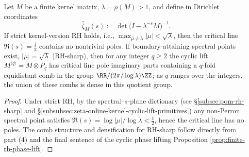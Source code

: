 \begin{corollary}\label{cor:xi-critical-line-poles-empty-or-dense}
Let \(M\) be a finite kernel matrix, \(\lambda=\rho(M)>1\), and define in Dirichlet coordinates
\[
\widehat{\zeta}_M(s):=\det\!\bigl(I-\lambda^{-s}M\bigr)^{-1}.
\]
If strict kernel-version RH holds, i.e., \(\max_{\mu\neq\lambda}|\mu|<\sqrt{\lambda}\), then the critical line \(\Re(s)=\tfrac12\) contains no nontrivial poles.
If boundary-attaining spectral points exist, \(|\mu|=\sqrt{\lambda}\) (RH-sharp), then for any integer \(q\ge 2\) the cyclic lift \(M^{\langle q\rangle}=M\otimes P_q\) has critical line pole imaginary parts containing a \(q\)-fold equidistant comb in the group \(\RR/(2\pi/\log\lambda)\ZZ\); as \(q\) ranges over the integers, the union of these combs is dense in this quotient group.
\end{corollary}

\begin{proof}
Under strict RH, by the spectral--\(s\)-plane dictionary (see \S\ref{subsec:pom-rh-sharp} and \S\ref{subsubsec:zeta-online-kernel-cyclic-lift-primitives}) any non-Perron spectral point satisfies \(\Re(s)=\log|\mu|/\log\lambda<\tfrac12\), hence the critical line has no poles.
The comb structure and densification for RH-sharp follow directly from part (4) and the final sentence of the cyclic phase lifting Proposition \ref{prop:finite-rh-phase-lift}.
\end{proof}

